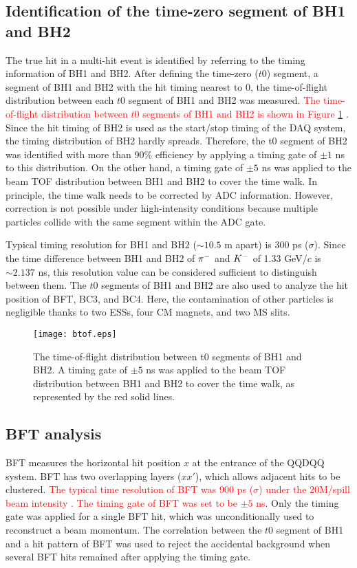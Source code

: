 \subsection{Identification of the time-zero segment of BH1 and BH2}
The true hit in a multi-hit event is identified by referring to the timing information of BH1 and BH2. After defining the time-zero ($t0$) segment, a segment of BH1 and BH2 with the hit timing nearest to 0, the time-of-flight distribution between each $t0$ segment of BH1 and BH2 was measured. \textcolor{red}{ The time-of-flight distribution between $t0$ segments of BH1 and BH2 is shown in Figure \ref{fig-btof} }. Since the hit timing of BH2 is used as the start/stop timing of the DAQ system, the timing distribution of BH2 hardly spreads.
Therefore, the t0 segment of BH2 was identified with more than 90\% efficiency by applying a timing gate of $\pm1$ ns to this distribution. On the other hand, a timing gate of $\pm5$ ns was applied to the beam TOF distribution between BH1 and BH2 to cover the time walk. In principle, the time walk needs to be corrected by ADC information. However, correction is not possible under high-intensity conditions because multiple particles collide with the same segment within the ADC gate.

Typical timing resolution for BH1 and BH2 ($\sim10.5$ m apart) is 300 ps ($\sigma$). Since the time difference between BH1 and BH2 of $\pi^{-}$ and $K^{-}$ of 1.33 GeV/$c$ is $\sim2.137$ ns, this resolution value can be considered sufficient to distinguish between them. The $t0$ segments of BH1 and BH2 are also used to analyze the hit position of BFT, BC3, and BC4. Here, the contamination of other particles is negligible thanks to two ESSs, four CM magnets, and two MS slits. 

\begin{figure}[!h]
  \begin{center}
    \texttt{[image: btof.eps]}
    \caption{The time-of-flight distribution between t0 segments of BH1 and BH2. A timing gate of $\pm5$ ns was applied to the beam TOF distribution between BH1 and BH2 to cover the time walk, as represented by the red solid lines.}
    \label{fig-btof}
  \end{center}
\end{figure}

\subsection{BFT analysis}
BFT measures the horizontal hit position $x$ at the entrance of the QQDQQ system. BFT has two overlapping layers ($xx'$), which allows adjacent hits to be clustered. \textcolor{red}{The typical time resolution of BFT was 900 ps ($\sigma$) under the 20M/spill beam intensity \cite{Nana-D}. The timing gate of BFT was set to be $\pm5$ ns}. Only the timing gate was applied for a single BFT hit, which was unconditionally used to reconstruct a beam momentum. The correlation between the $t0$ segment of BH1 and a hit pattern of BFT was used to reject the accidental background when several BFT hits remained after applying the timing gate.

